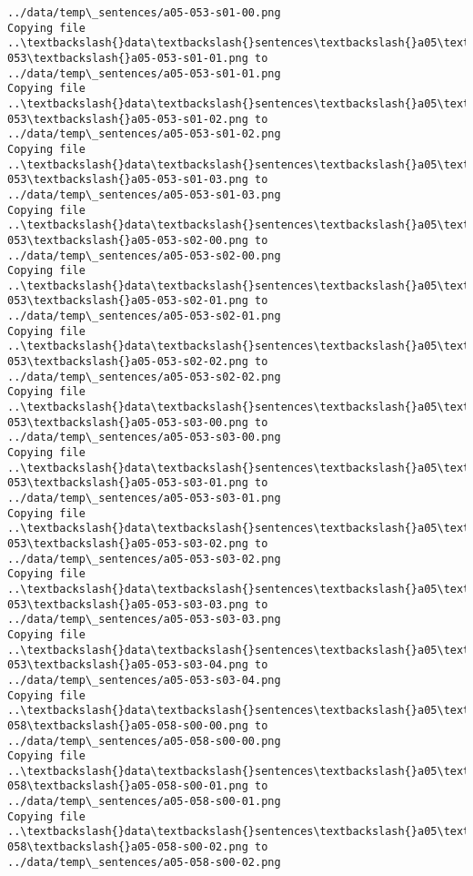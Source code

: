 \documentclass[11pt]{article}
\begin{document}
\begin{Verbatim}[commandchars=\\\{\}]
../data/temp\_sentences/a05-053-s01-00.png
Copying file ..\textbackslash{}data\textbackslash{}sentences\textbackslash{}a05\textbackslash{}a05-053\textbackslash{}a05-053-s01-01.png to
../data/temp\_sentences/a05-053-s01-01.png
Copying file ..\textbackslash{}data\textbackslash{}sentences\textbackslash{}a05\textbackslash{}a05-053\textbackslash{}a05-053-s01-02.png to
../data/temp\_sentences/a05-053-s01-02.png
Copying file ..\textbackslash{}data\textbackslash{}sentences\textbackslash{}a05\textbackslash{}a05-053\textbackslash{}a05-053-s01-03.png to
../data/temp\_sentences/a05-053-s01-03.png
Copying file ..\textbackslash{}data\textbackslash{}sentences\textbackslash{}a05\textbackslash{}a05-053\textbackslash{}a05-053-s02-00.png to
../data/temp\_sentences/a05-053-s02-00.png
Copying file ..\textbackslash{}data\textbackslash{}sentences\textbackslash{}a05\textbackslash{}a05-053\textbackslash{}a05-053-s02-01.png to
../data/temp\_sentences/a05-053-s02-01.png
Copying file ..\textbackslash{}data\textbackslash{}sentences\textbackslash{}a05\textbackslash{}a05-053\textbackslash{}a05-053-s02-02.png to
../data/temp\_sentences/a05-053-s02-02.png
Copying file ..\textbackslash{}data\textbackslash{}sentences\textbackslash{}a05\textbackslash{}a05-053\textbackslash{}a05-053-s03-00.png to
../data/temp\_sentences/a05-053-s03-00.png
Copying file ..\textbackslash{}data\textbackslash{}sentences\textbackslash{}a05\textbackslash{}a05-053\textbackslash{}a05-053-s03-01.png to
../data/temp\_sentences/a05-053-s03-01.png
Copying file ..\textbackslash{}data\textbackslash{}sentences\textbackslash{}a05\textbackslash{}a05-053\textbackslash{}a05-053-s03-02.png to
../data/temp\_sentences/a05-053-s03-02.png
Copying file ..\textbackslash{}data\textbackslash{}sentences\textbackslash{}a05\textbackslash{}a05-053\textbackslash{}a05-053-s03-03.png to
../data/temp\_sentences/a05-053-s03-03.png
Copying file ..\textbackslash{}data\textbackslash{}sentences\textbackslash{}a05\textbackslash{}a05-053\textbackslash{}a05-053-s03-04.png to
../data/temp\_sentences/a05-053-s03-04.png
Copying file ..\textbackslash{}data\textbackslash{}sentences\textbackslash{}a05\textbackslash{}a05-058\textbackslash{}a05-058-s00-00.png to
../data/temp\_sentences/a05-058-s00-00.png
Copying file ..\textbackslash{}data\textbackslash{}sentences\textbackslash{}a05\textbackslash{}a05-058\textbackslash{}a05-058-s00-01.png to
../data/temp\_sentences/a05-058-s00-01.png
Copying file ..\textbackslash{}data\textbackslash{}sentences\textbackslash{}a05\textbackslash{}a05-058\textbackslash{}a05-058-s00-02.png to
../data/temp\_sentences/a05-058-s00-02.png

\end{Verbatim}
\end{document}
